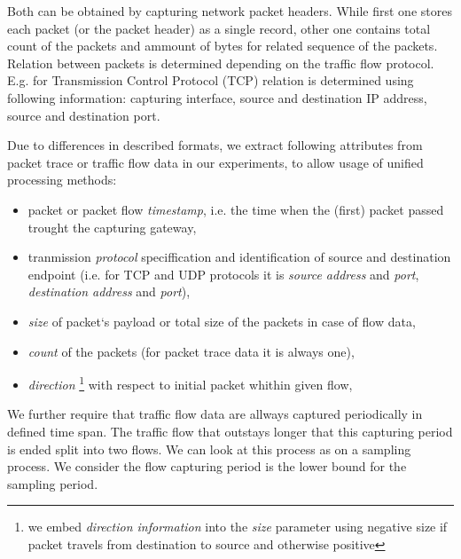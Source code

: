Both can be obtained by capturing
network packet headers. While first one stores each packet (or the packet header)
as a single record,
other one contains total count of the packets and ammount of bytes for 
related sequence of the packets. Relation between packets is determined depending 
on the traffic flow protocol. E.g. for Transmission Control Protocol (TCP) relation is 
determined using following information: capturing interface, source and destination IP address,
source and destination port. 
%
%

Due to differences in described formats, we extract following attributes 
from packet trace or traffic flow data in our experiments, 
to allow usage of unified processing methods:
\begin{itemize}
	\item packet or packet flow \emph{timestamp}, i.e. the time when the (first) packet passed
	trought the capturing gateway,
	\item tranmission \emph{protocol} speciffication and identification of 
	source and destination endpoint 
	(i.e. for TCP and UDP protocols it is \emph{source address} and \emph{port}, 
	\emph{destination address}  and \emph{port}),
	\item \emph{size} of packet`s payload or total size of the packets in case of flow data,
	\item \emph{count} of the packets (for packet trace data it is always one),
	\item \emph{direction}%
	\footnote{we embed \emph{direction information} 
	into the \emph{size} parameter using negative size  
	if packet travels from destination to source and otherwise positive} %
	with respect to initial packet whithin given flow,
\end{itemize}

We further require that traffic flow data are allways captured periodically in defined time span.
The traffic flow that outstays longer that this capturing period is ended split into two flows.
We can look at this process as on a sampling process. We consider the flow capturing period
is the lower bound for the sampling period.  

